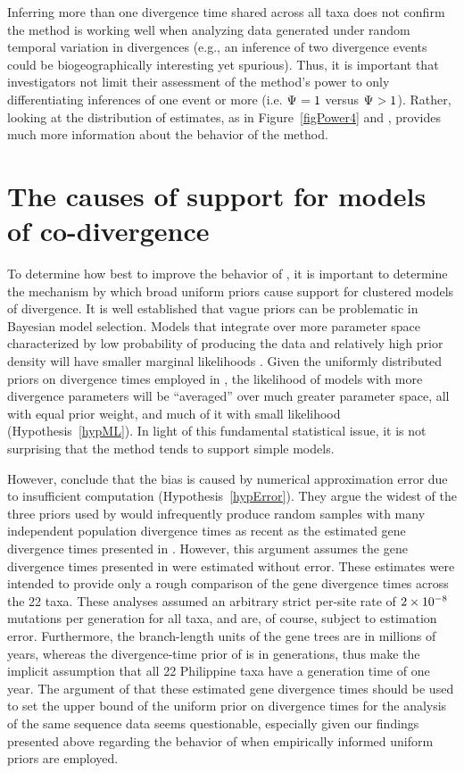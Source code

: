 Inferring more than one divergence time shared across all taxa does not confirm
the method is working well when analyzing data generated under random temporal
variation in divergences (e.g., an inference of two divergence events could be
biogeographically interesting yet spurious).
Thus, it is important that investigators not limit their assessment of the
method's power to only differentiating inferences of one event or more (i.e.
$\Psi_{} = 1$ versus $\Psi_{} > 1$).
Rather, looking at the distribution of estimates, as in Figure~\ref{figPower4}
and \citet{Oaks2012}, provides much more information about the behavior of the
method.


\section{The causes of support for models of co-divergence}
To determine how best to improve the behavior of \msb, it is important to
determine the mechanism by which broad uniform priors cause support for
clustered models of divergence.
It is well established that vague priors can be problematic in Bayesian model
selection.
Models that integrate over more parameter space characterized by low
probability of producing the data and relatively high prior density will have
smaller marginal likelihoods \citep{Jeffreys1939,Lindley1957}.
Given the uniformly distributed priors on divergence times employed in \msb,
the likelihood of models with more divergence parameters will be ``averaged''
over much greater parameter space, all with equal prior weight, and much of it
with small likelihood (Hypothesis~\ref{hypML}).
In light of this fundamental statistical issue, it is not surprising that the
method tends to support simple models.

However, \citet{Hickerson2013} conclude that the bias is caused by numerical
approximation error due to insufficient computation
(Hypothesis~\ref{hypError}).
They argue the widest of the three priors used by \citet{Oaks2012} would
infrequently produce random samples with many independent population divergence
times as recent as the estimated gene divergence times presented in
\citet{Oaks2012}.
However, this argument assumes the gene divergence times presented in
\citet{Oaks2012} were estimated without error.
These estimates were intended to provide only a rough comparison of the
gene divergence times across the 22 taxa.
These analyses assumed an arbitrary strict per-site rate of $2\times 10^{-8}$ mutations
per generation for all taxa, and are, of course, subject to estimation error.
Furthermore, the branch-length units of the gene trees are in millions of
years, whereas the divergence-time prior of \msb is in generations, thus
\citet{Hickerson2013} make the implicit assumption that all 22 Philippine taxa
have a generation time of one year.
The argument of \citet{Hickerson2013} that these estimated gene divergence
times should be used to set the upper bound of the uniform prior on divergence
times for the \msb analysis of the same sequence data seems questionable,
especially given our findings presented above regarding the behavior of \msb
when empirically informed uniform priors are employed.

